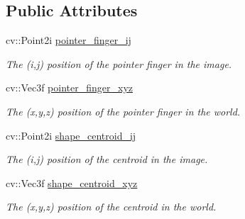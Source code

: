 \subsection*{Public Attributes}
\begin{DoxyCompactItemize}
\item 
\hypertarget{class_hand_a7a7147d586c8fc8f781be0ed0dac1d94}{}\label{class_hand_a7a7147d586c8fc8f781be0ed0dac1d94} 
cv\+::\+Point2i \hyperlink{class_hand_a7a7147d586c8fc8f781be0ed0dac1d94}{pointer\+\_\+finger\+\_\+ij}
\begin{DoxyCompactList}\small\item\em The (i,j) position of the pointer finger in the image. \end{DoxyCompactList}\item 
\hypertarget{class_hand_abeb7b0f0414f128dff4a189137fe35c9}{}\label{class_hand_abeb7b0f0414f128dff4a189137fe35c9} 
cv\+::\+Vec3f \hyperlink{class_hand_abeb7b0f0414f128dff4a189137fe35c9}{pointer\+\_\+finger\+\_\+xyz}
\begin{DoxyCompactList}\small\item\em The (x,y,z) position of the pointer finger in the world. \end{DoxyCompactList}\item 
\hypertarget{class_hand_a86d74ccce4bbfafa5825762713d38b44}{}\label{class_hand_a86d74ccce4bbfafa5825762713d38b44} 
cv\+::\+Point2i \hyperlink{class_hand_a86d74ccce4bbfafa5825762713d38b44}{shape\+\_\+centroid\+\_\+ij}
\begin{DoxyCompactList}\small\item\em The (i,j) position of the centroid in the image. \end{DoxyCompactList}\item 
\hypertarget{class_hand_a3991a22a52268c3b469a4221fbfdb695}{}\label{class_hand_a3991a22a52268c3b469a4221fbfdb695} 
cv\+::\+Vec3f \hyperlink{class_hand_a3991a22a52268c3b469a4221fbfdb695}{shape\+\_\+centroid\+\_\+xyz}
\begin{DoxyCompactList}\small\item\em The (x,y,z) position of the centroid in the world. \end{DoxyCompactList}\end{DoxyCompactItemize}
